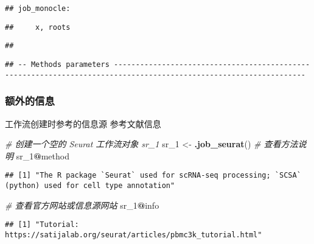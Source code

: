 \documentclass[
]{article}
\newenvironment{Shaded}{\begin{snugshade}}{\end{snugshade}}
\newcommand{\CommentTok}[1]{\textcolor[rgb]{0.56,0.35,0.01}{\textit{#1}}}
\newcommand{\DecValTok}[1]{\textcolor[rgb]{0.00,0.00,0.81}{#1}}
\newcommand{\KeywordTok}[1]{\textcolor[rgb]{0.13,0.29,0.53}{\textbf{#1}}}
\newcommand{\NormalTok}[1]{#1}
\newcommand{\OperatorTok}[1]{\textcolor[rgb]{0.81,0.36,0.00}{\textbf{#1}}}
\newcommand{\StringTok}[1]{\textcolor[rgb]{0.31,0.60,0.02}{#1}}
\begin{document}
\begin{verbatim}
## job_monocle:
\end{verbatim}

\begin{verbatim}
##     x, roots
\end{verbatim}

\begin{verbatim}
## 
\end{verbatim}

\begin{verbatim}
## -- Methods parameters ------------------------------------------------------------------------------------------------------------------
\end{verbatim}

\hypertarget{ux989dux5916ux7684ux4fe1ux606f}{%
\subsubsection{额外的信息}\label{ux989dux5916ux7684ux4fe1ux606f}}

工作流创建时参考的信息源
参考文献信息

\begin{Shaded}
\begin{Highlighting}[]
\CommentTok{\# 创建一个空的 Seurat 工作流对象 \textquotesingle{}sr\_1\textquotesingle{}}
\NormalTok{sr\_}\DecValTok{1}\NormalTok{ \textless{}{-}}\StringTok{ }\KeywordTok{.job\_seurat}\NormalTok{()}
\CommentTok{\# 查看方法说明}
\NormalTok{sr\_}\DecValTok{1}\OperatorTok{@}\NormalTok{method}
\end{Highlighting}
\end{Shaded}

\begin{verbatim}
## [1] "The R package `Seurat` used for scRNA-seq processing; `SCSA` (python) used for cell type annotation"
\end{verbatim}

\begin{Shaded}
\begin{Highlighting}[]
\CommentTok{\# 查看官方网站或信息源网站}
\NormalTok{sr\_}\DecValTok{1}\OperatorTok{@}\NormalTok{info}
\end{Highlighting}
\end{Shaded}

\begin{verbatim}
## [1] "Tutorial: https://satijalab.org/seurat/articles/pbmc3k_tutorial.html"
\end{verbatim}
\end{document}

